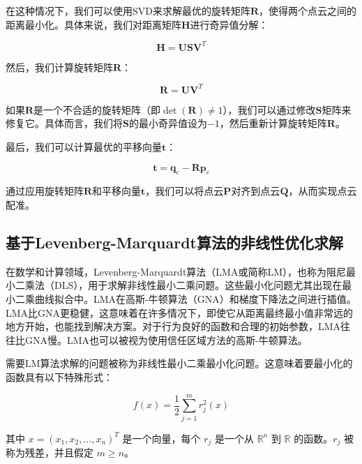 在这种情况下，我们可以使用SVD来求解最优的旋转矩阵$\boldsymbol{R}$，使得两个点云之间的距离最小化。具体来说，我们对距离矩阵$\boldsymbol{H}$进行奇异值分解：

\begin{equation}
\boldsymbol{H} = \boldsymbol{U} \boldsymbol{S} \boldsymbol{V}^T
\end{equation}

然后，我们计算旋转矩阵$\boldsymbol{R}$：

\begin{equation}
\boldsymbol{R} = \boldsymbol{U} \boldsymbol{V}^T
\end{equation}

如果$\boldsymbol{R}$是一个不合适的旋转矩阵（即$\det(\boldsymbol{R})\neq 1$），我们可以通过修改$\boldsymbol{S}$矩阵来修复它。具体而言，我们将$\boldsymbol{S}$的最小奇异值设为$-1$，然后重新计算旋转矩阵$\boldsymbol{R}$。

最后，我们可以计算最优的平移向量$\boldsymbol{t}$：

\begin{equation}
\boldsymbol{t} = \boldsymbol{q}_c - \boldsymbol{R} \boldsymbol{p}_c
\end{equation}

通过应用旋转矩阵$\boldsymbol{R}$和平移向量$\boldsymbol{t}$，我们可以将点云$\boldsymbol{P}$对齐到点云$\boldsymbol{Q}$，从而实现点云配准。

\subsection{基于Levenberg-Marquardt算法的非线性优化求解}
在数学和计算领域，Levenberg-Marquardt算法（LMA或简称LM）\cite{levenberg1944method}，也称为阻尼最小二乘法（DLS），用于求解非线性最小二乘问题。这些最小化问题尤其出现在最小二乘曲线拟合中。LMA在高斯-牛顿算法（GNA）\cite{}和梯度下降法之间进行插值。LMA比GNA更稳健，这意味着在许多情况下，即使它从距离最终最小值非常远的地方开始，也能找到解决方案。对于行为良好的函数和合理的初始参数，LMA往往比GNA慢。LMA也可以被视为使用信任区域方法的高斯-牛顿算法。

需要LM算法求解的问题被称为非线性最小二乘最小化问题。这意味着要最小化的函数具有以下特殊形式：

\begin{equation}
f(x) = \frac{1}{2} \sum_{j=1}^{m} r_j^2(x)
\end{equation}

其中 $x = (x_1, x_2, \dots, x_n)^T$ 是一个向量，每个 $r_j$ 是一个从 $\mathbb{R}^n$ 到 $\mathbb{R}$ 的函数。$r_j$ 被称为残差，并且假定 $m \geq n$。

